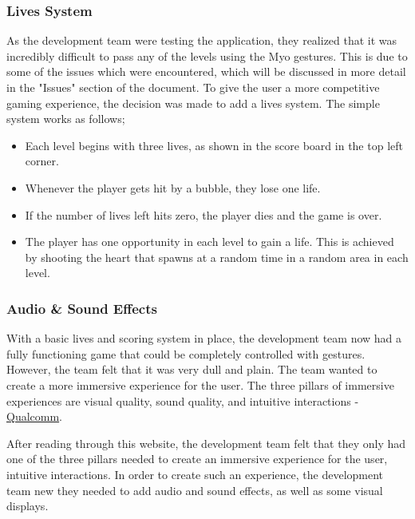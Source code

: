 \documentclass{article}
\begin{document}
\subsubsection{Lives System}
As the development team were testing the application, they realized that it was incredibly difficult to pass any of the levels using the Myo gestures. This is due to some of the issues which were encountered, which will be discussed in more detail in the "Issues" section of the document. To give the user a more competitive gaming experience, the decision was made to add a lives system. The simple system works as follows;

\begin{itemize}
    \item Each level begins with three lives, as shown in the score board in the top left corner.
    
    \item Whenever the player gets hit by a bubble, they lose one life.
    
    \item If the number of lives left hits zero, the player dies and the game is over. 
    
    \item The player has one opportunity in each level to gain a life. This is achieved by shooting the heart that spawns at a random time in a random area in each level.
\end{itemize}

\subsubsection{Audio \& Sound Effects}

With a basic lives and scoring system in place, the development team now had a fully functioning game that could be completely controlled with gestures. However, the team felt that it was very dull and plain. The team wanted to create a more immersive experience for the user. The three pillars of immersive experiences are visual quality, sound quality, and intuitive interactions - \href{https://www.qualcomm.com/invention/cognitive-technologies/immersive-experiences}{Qualcomm}.

\bigskip

After reading through this website, the development team felt that they only had one of the three pillars needed to create an immersive experience for the user, intuitive interactions. In order to create such an experience, the development team new they needed to add audio and sound effects, as well as some visual displays. 
\end{document}
